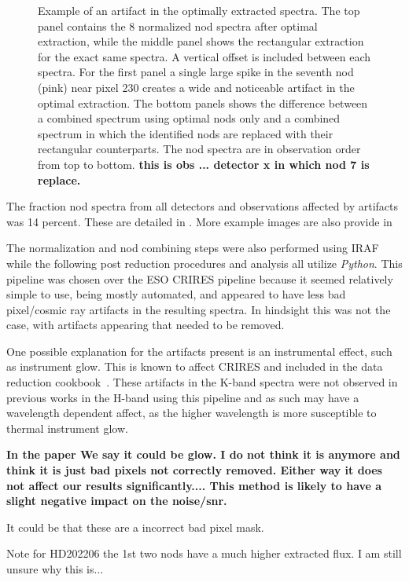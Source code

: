 \begin{figure}
    \caption{Example of an artifact in the optimally extracted spectra. The top panel contains the 8 normalized nod spectra after optimal extraction, while the middle panel shows the rectangular extraction for the exact same spectra. A vertical offset is included between each spectra. For the first panel a single large spike in the seventh nod (pink) near pixel 230 creates a wide and noticeable artifact in the optimal extraction. The bottom panels shows the difference between a combined spectrum using optimal nods only and a combined spectrum in which the identified nods are replaced with their rectangular counterparts. The nod spectra are in observation order from top to bottom.  \textbf{this is obs ... detector x in which nod 7 is replace.}}
    \label{fig:badpixelreplacement}
\end{figure}

The fraction nod spectra from all detectors and observations affected by artifacts was 14 percent. These are detailed in . More example images are also provide in  


The normalization and nod combining steps were also performed using IRAF while the following post reduction procedures and analysis all utilize \emph{Python}. This pipeline was chosen over the ESO CRIRES pipeline because it seemed relatively simple to use, being mostly automated, and appeared to have less bad pixel/cosmic ray artifacts in the resulting spectra. In hindsight this was not the case, with artifacts appearing that needed to be removed. 

One possible explanation for the artifacts present is an instrumental effect, such as instrument glow. This is known to affect CRIRES and included in the data reduction cookbook~\citep{smoker_very_2012}. These artifacts in the K-band spectra were not observed in previous works in the H-band using this pipeline and as such may have a wavelength dependent affect, as the higher wavelength {\nir} is more susceptible to thermal instrument glow.



\textbf{In the paper We say it could be glow. I do not think it is anymore and think it is just bad pixels not correctly removed. Either way it does not affect our results significantly....
This method is likely to have a slight negative impact on the noise/snr.}

It could be that these are a incorrect bad pixel mask.


Note for HD202206 the 1st two nods have a much higher extracted flux. I am still unsure why this is...

